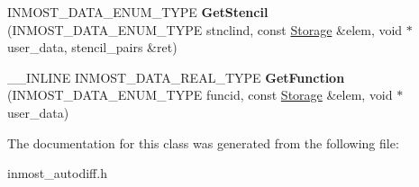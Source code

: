 \begin{DoxyCompactItemize}
\item 
\hypertarget{classINMOST_1_1Automatizator_a0873f51c2f40480337ff3de86cb0ac01}{I\-N\-M\-O\-S\-T\-\_\-\-D\-A\-T\-A\-\_\-\-E\-N\-U\-M\-\_\-\-T\-Y\-P\-E {\bfseries Get\-Stencil} (I\-N\-M\-O\-S\-T\-\_\-\-D\-A\-T\-A\-\_\-\-E\-N\-U\-M\-\_\-\-T\-Y\-P\-E stnclind, const \hyperlink{classINMOST_1_1Storage}{Storage} \&elem, void $\ast$user\-\_\-data, stencil\-\_\-pairs \&ret)}\label{classINMOST_1_1Automatizator_a0873f51c2f40480337ff3de86cb0ac01}

\item 
\hypertarget{classINMOST_1_1Automatizator_a4b6096d66053b8fb1cc35924dad84874}{\-\_\-\-\_\-\-I\-N\-L\-I\-N\-E I\-N\-M\-O\-S\-T\-\_\-\-D\-A\-T\-A\-\_\-\-R\-E\-A\-L\-\_\-\-T\-Y\-P\-E {\bfseries Get\-Function} (I\-N\-M\-O\-S\-T\-\_\-\-D\-A\-T\-A\-\_\-\-E\-N\-U\-M\-\_\-\-T\-Y\-P\-E funcid, const \hyperlink{classINMOST_1_1Storage}{Storage} \&elem, void $\ast$user\-\_\-data)}\label{classINMOST_1_1Automatizator_a4b6096d66053b8fb1cc35924dad84874}

\end{DoxyCompactItemize}


The documentation for this class was generated from the following file\-:\begin{DoxyCompactItemize}
\item 
inmost\-\_\-autodiff.\-h\end{DoxyCompactItemize}
